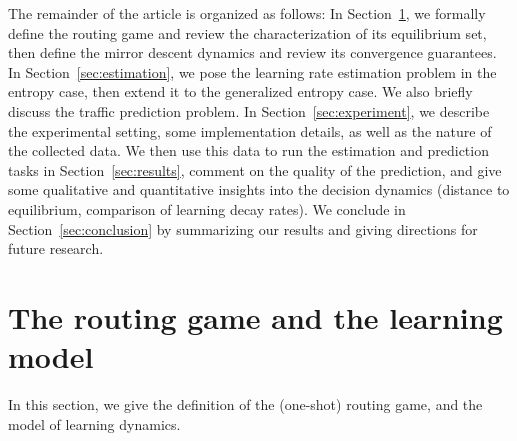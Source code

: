 \documentclass{sig-alternate-ipsn13}
\begin{document}
The remainder of the article is organized as follows: In Section~\ref{sec:model}, we formally define the routing game and review the characterization of its equilibrium set, then define the mirror descent dynamics and review its convergence guarantees. In Section~\ref{sec:estimation}, we pose the learning rate estimation problem in the entropy case, then extend it to the generalized entropy case. We also briefly discuss the traffic prediction problem. In Section~\ref{sec:experiment}, we describe the experimental setting, some implementation details, as well as the nature of the collected data. We then use this data to run the estimation and prediction tasks in Section~\ref{sec:results}, comment on the quality of the prediction, and give some qualitative and quantitative insights into the decision dynamics (distance to equilibrium, comparison of learning decay rates). We conclude in Section~\ref{sec:conclusion} by summarizing our results and giving directions for future research.

\section{The routing game and the learning model}
\label{sec:model}
In this section, we give the definition of the (one-shot) routing game, and the model of learning dynamics.
\end{document}

